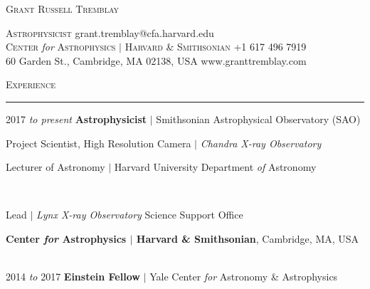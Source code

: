 \documentclass[11pt]{article}
\makeatletter
\def\vhrulefill#1{\leavevmode\leaders\hrule\@height#1\hfill \kern\z@}
\makeatother
\begin{document}
\thispagestyle{empty}

\begin{center}
\hspace*{0.5in}
{\Large \textsc{Grant Russell Tremblay}}\\
\end{center}
{\small
\hspace*{6mm}\textsc{Astrophysicist} \hfill grant.tremblay@cfa.harvard.edu\\
\hspace*{6mm}\textsc{Center} \textit{for} \textsc{Astrophysics $|$ Harvard \& Smithsonian}  \hfill +1 617 496 7919\\
\hspace*{6mm}60 Garden St., Cambridge, MA 02138, USA \hfill www.granttremblay.com\\}



\textsc{Experience} \vhrulefill{0.4pt}


\vspace{2mm}


\hspace{2.5mm} 2017 \textit{to present} \hspace{13.5mm} \textbf{Astrophysicist} $|$ Smithsonian Astrophysical Observatory (SAO)

\hspace{42mm} \parbox{5.15in}{Project Scientist, High Resolution Camera $|$ \textit{Chandra X-ray Observatory}}


\hspace{42mm} \parbox{5.15in}{Lecturer of Astronomy $|$ Harvard University Department \textit{of} Astronomy}


\

\hspace{42mm} \parbox{5.15in}{Lead $|$ \textit{Lynx X-ray Observatory} Science Support Office}



\hspace{42mm} \parbox{5.15in}{ \textbf{Center \textit{for} Astrophysics $|$ Harvard \& Smithsonian}, Cambridge, MA, USA}\\


\hspace{2.5mm} 2014 \textit{to} 2017 \hspace{17mm} \textbf{Einstein Fellow}
$|$ Yale Center \textit{for} Astronomy \& Astrophysics
\end{document}
